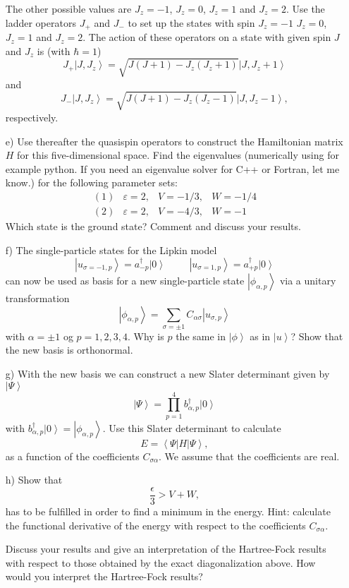 \documentclass[11pt,a4wide]{article}
\newcommand{\bra}[1]{\left\langle #1 \right|}
\newcommand{\ket}[1]{\left| #1 \right\rangle}
\begin{document}
\begin{enumerate}
The other possible values are  $J_{z}=-1$, $J_{z}=0$, $J_{z}=1$
and $J_{z}=2$. 
Use the ladder operators
$J_{+}$ and $J_{-}$  to set up the states 
with spin $J_{z}=-1$ $J_{z}=0$, $J_{z}=1$
and $J_{z}=2$.  
The action of these operators on a state with given spin 
$J$ and $J_z$ is  (with $\hbar = 1$) 
\[
J_+\ket{J,J_z}=\sqrt{J(J+1)-J_z(J_z+1)}\ket{J,J_z+1}
\] 
and
\[
J_-\ket{J,J_z}=\sqrt{J(J+1)-J_z(J_z-1)}\ket{J,J_z-1},
\] respectively.
\newline
\item[e)] Use thereafter the quasispin operators to construct the Hamiltonian matrix 
$H$ for this five-dimensional space.  Find the eigenvalues
(numerically using for example python. If you need an eigenvalue solver for C++ or Fortran, let me know.)  for the following parameter sets:
\[
\begin{array}{cccc}
(1)&\varepsilon=2,&V=-1/3,&W=-1/4\\
(2)&\varepsilon=2,&V=-4/3,&W=-1
\end{array}
\]
Which state is the ground state? Comment and discuss your results.\newline
\item[f)]
The single-particle states for the 
 Lipkin model
\[
\ket{u_{\sigma =-1,p}}=a_{-p}^{\dagger}\ket{0}
\hspace{1cm}
\ket{u_{\sigma =1,p}}=a_{+p}^{\dagger}\ket{0}
\]
can now be used as basis for a new single-particle state
$\ket{\phi_{\alpha ,p}}$  via a unitary  transformation
\[
\ket{\phi_{\alpha ,p}}=
\sum_{\sigma =\pm1}C_{\alpha\sigma}\ket{u_{\sigma ,p}}
\]
with $\alpha=\pm 1$ og $p=1,2,3,4$. Why is $p$ the same in 
$\ket{\phi}$
as in $\ket{u}$?  Show that the new basis is orthonormal.\newline
\item[g)] With the new basis we can construct a new Slater determinant given by
$\ket{\Psi}$
\[
\ket{\Psi}=\prod_{p=1}^{4}b_{\alpha ,p}^{\dagger}\ket{0}
\]
with $b_{\alpha ,p}^{\dagger}\ket{0}=\ket{\phi_{\alpha ,p}}$. Use this Slater determinant to calculate
\[
E=\bra{\Psi}H\ket{\Psi},
\]
as a function of the coefficients $C_{\sigma\alpha}$. We assume that the coefficients are real.\newline
\item[h)] Show that
\[
  \frac{\epsilon}{3} > V+W,
\]
has to be fulfilled in order to find a minimum in the energy.
Hint: calculate the functional derivative  of the energy with respect to the coefficients $C_{\sigma\alpha}$. 

Discuss your results and give an interpretation of the Hartree-Fock results with respect to those obtained
by the exact diagonalization above. How would you interpret the Hartree-Fock results?


\end{enumerate}
\end{document}
